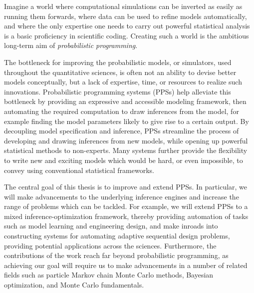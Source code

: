 
\vspace{20pt}
Imagine a world where computational simulations can be inverted as easily as running them forwards, where data
can be used to refine models automatically, and where the only expertise one needs to carry
out powerful statistical analysis is a basic proficiency in scientific coding.  Creating such a
world is the ambitious long-term aim of \emph{probabilistic programming}.

The bottleneck for improving the probabilistic models, or simulators, used throughout the quantitative sciences,
is often not an ability to devise better models conceptually,  but a lack of expertise,
time, or resources to realize such innovations.
Probabilistic programming systems (PPSs) help alleviate this bottleneck 
by providing an expressive and accessible modeling framework,
 then
automating the required computation to draw inferences from the model, for example finding
the model parameters likely to give rise to a certain output.
By decoupling model specification and inference, PPSs 
streamline the process of developing and drawing inferences from new models, while
opening up powerful statistical methods to non-experts.
Many systems further provide
the flexibility to write new and exciting models which would be hard, or even impossible, to convey using 
conventional statistical frameworks.

The central goal of this thesis is to improve and extend PPSs.
In particular, we will
make advancements to the underlying inference engines and increase the
range of problems which can be tackled.  For example, we will extend PPSs to a mixed inference-optimization
framework, thereby providing automation of tasks
such as model learning and engineering design, and make inroads into constructing systems
for automating adaptive sequential design problems, providing potential applications across the sciences.
Furthermore, the contributions of the work reach far beyond probabilistic programming, as 
achieving our goal will require us to make
advancements in a number of related fields such as particle Markov chain Monte Carlo methods,
Bayesian optimization, and Monte Carlo fundamentals. %

